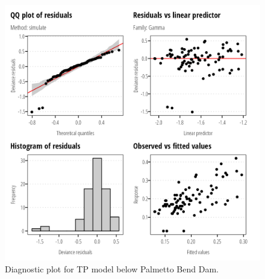 \documentclass[
]{article}
\begin{document}
\clearpage

\begin{figure}[h]

{\centering \includegraphics{model_assessment_files/figure-pdf/unnamed-chunk-70-1.png}

}

\caption{Diagnostic plot for TP model below Palmetto Bend Dam.}

\end{figure}
\end{document}
